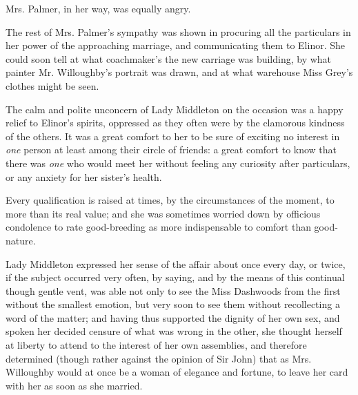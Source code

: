 Mrs. Palmer, in her way, was equally angry. 

The rest of Mrs. Palmer's sympathy was shown in procuring all the particulars in her power of the approaching marriage, and communicating them to Elinor. She could soon tell at what coachmaker's the new carriage was building, by what painter Mr. Willoughby's portrait was drawn, and at what warehouse Miss Grey's clothes might be seen.

The calm and polite unconcern of Lady Middleton on the occasion was a happy relief to Elinor's spirits, oppressed as they often were by the clamorous kindness of the others. It was a great comfort to her to be sure of exciting no interest in {\em one} person at least among their circle of friends: a great comfort to know that there was {\em one} who would meet her without feeling any curiosity after particulars, or any anxiety for her sister's health.

Every qualification is raised at times, by the circumstances of the moment, to more than its real value; and she was sometimes worried down by officious condolence to rate good-breeding as more indispensable to comfort than good-nature.

Lady Middleton expressed her sense of the affair about once every day, or twice, if the subject occurred very often, by saying,  and by the means of this continual though gentle vent, was able not only to see the Miss Dashwoods from the first without the smallest emotion, but very soon to see them without recollecting a word of the matter; and having thus supported the dignity of her own sex, and spoken her decided censure of what was wrong in the other, she thought herself at liberty to attend to the interest of her own assemblies, and therefore determined (though rather against the opinion of Sir John) that as Mrs. Willoughby would at once be a woman of elegance and fortune, to leave her card with her as soon as she married.

